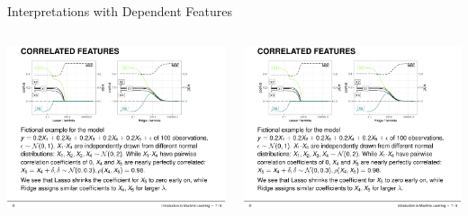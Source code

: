 \documentclass[11pt,compress,t,notes=noshow, aspectratio=169, xcolor=table]{beamer}
\begin{document}
\begin{frame}{Interpretations with Dependent Features}
\begin{itemize}
\colorbox{blue!20}{\begin{columns}[c, totalwidth=\linewidth]
\begin{column}{0.5\linewidth}
\includegraphics[trim=0px 110px 30px 0px, clip, width=\linewidth]{figure/ridge_lasso}
\end{column}
\begin{column}{0.5\linewidth}
\includegraphics[trim=0px 0px 0px 115px, clip, width=\linewidth]{figure/ridge_lasso}
\end{column}
\end{columns}}

\end{itemize}
\end{frame}
\end{document}
